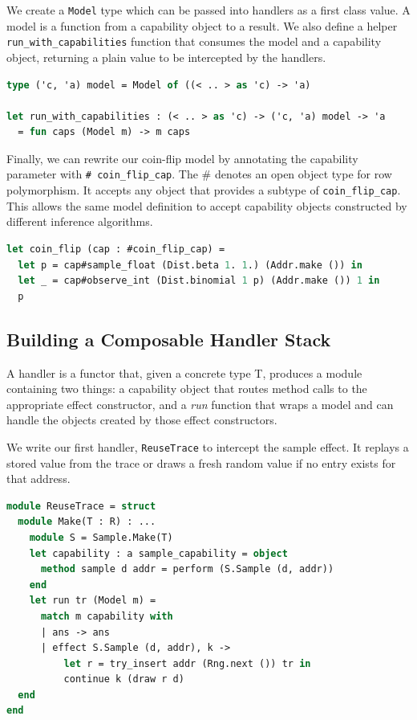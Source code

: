 \documentclass[logo,bsc,singlespacing,parskip,online]{infthesis}
\begin{document}
We create a \texttt{Model} type which can be passed into handlers as a first class value. A model is a function from a capability object to a result. We also define a helper \texttt{run\_with\_capabilities} function that consumes the model and a capability object, returning a plain value to be intercepted by the handlers. 

\begin{lstlisting}[language=OCaml]
type ('c, 'a) model = Model of ((< .. > as 'c) -> 'a)

let run_with_capabilities : (< .. > as 'c) -> ('c, 'a) model -> 'a
  = fun caps (Model m) -> m caps
\end{lstlisting}

Finally, we can rewrite our coin-flip model by annotating the capability parameter with \texttt{\# coin\_flip\_cap}. The \# denotes an open object type for row polymorphism. It accepts any object that provides a subtype of \texttt{coin\_flip\_cap}. This allows the same model definition to accept capability objects constructed by different inference algorithms.

\begin{lstlisting}[language=OCaml]
let coin_flip (cap : #coin_flip_cap) =
  let p = cap#sample_float (Dist.beta 1. 1.) (Addr.make ()) in
  let _ = cap#observe_int (Dist.binomial 1 p) (Addr.make ()) 1 in
  p
\end{lstlisting}

\subsection{Building a Composable Handler Stack} 

A handler is a functor that, given a concrete type T, produces a module containing two things: a capability object that routes method calls to the appropriate effect constructor, and a \textit{run} function that wraps a model and can handle the objects created by those effect constructors.

We write our first handler, \texttt{ReuseTrace} to intercept the sample effect. It replays a stored value from the trace or draws a fresh random value if no entry exists for that address.

\begin{lstlisting}[language=OCaml]
module ReuseTrace = struct
  module Make(T : R) : ...
    module S = Sample.Make(T)
    let capability : a sample_capability = object
      method sample d addr = perform (S.Sample (d, addr))
    end
    let run tr (Model m) =
      match m capability with
      | ans -> ans
      | effect S.Sample (d, addr), k ->
          let r = try_insert addr (Rng.next ()) tr in
          continue k (draw r d)
  end
end
\end{lstlisting}
\end{document}
